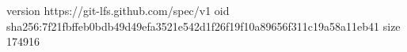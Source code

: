 version https://git-lfs.github.com/spec/v1
oid sha256:7f21fbffeb0bdb49d49efa3521e542d1f26f19f10a89656f311c19a58a11eb41
size 174916
